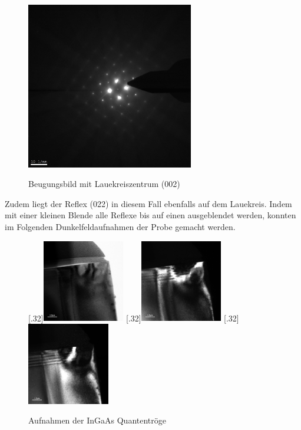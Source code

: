 \documentclass[a4paper,11pt,DIV=11]{scrartcl}
\begin{document}
\begin{figure}[h]\centering
	\includegraphics[width=0.65\textwidth]{Versuchsdaten/9/002.jpg}
\label{002}
\caption{Beugungsbild mit Lauekreiszentrum (002)}
\end{figure}

Zudem liegt der Reflex (022) in diesem Fall ebenfalls auf dem Lauekreis. Indem mit einer kleinen Blende alle Reflexe bis auf einen ausgeblendet werden, konnten im Folgenden Dunkelfeldaufnahmen der Probe gemacht werden.

\begin{figure}[htb]\centering
	[.32\linewidth]{\includegraphics[width=0.32\textwidth]{Versuchsdaten/10/hell.jpg}}
	[.32\linewidth]{\includegraphics[width=0.32\textwidth]{Versuchsdaten/10/004-dunkel.jpg}}
	[.32\linewidth]{\includegraphics[width=0.32\textwidth]{Versuchsdaten/10/022-dunkel.jpg}}
	\caption{Aufnahmen der InGaAs Quantentröge} \label{dunkelhell}
\end{figure}
\end{document}
